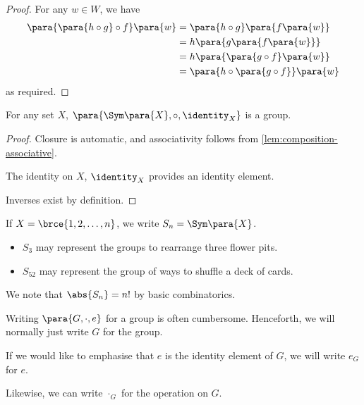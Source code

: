 \begin{proof}
    For any \(w \in W\), we have
    \begin{align*}
        \para{\para{h \circ g} \circ f} \para{w} &= \para{h \circ g} \para{f\para{w}} \\
        &= h \para{g \para{f \para{w}}} \\
        &= h \para{\para{g \circ f} \para{w}} \\
        &= \para{h \circ \para{g \circ f}} \para{w}
    \end{align*}
    as required.
\end{proof}

\begin{proposition}
    \label{prop:symmetry-group}%
    For any set \(X\), \(\para{\Sym\para{X}, \circ, \identity_X}\) is a group.
\end{proposition}

\begin{proof}
    Closure is automatic, and associativity follows from \autoref{lem:composition-associative}.

    The identity on \(X\), \(\identity_X\) provides an identity element.

    Inverses exist by definition.
\end{proof}

\begin{definition}[\(S_n\)]
    \label{def:s-n}%
    If \(X = \brce{1, 2, \ldots, n}\), we write \(S_n = \Sym\para{X}\).
\end{definition}

\begin{examples}
    \begin{itemize}
        \item \(S_3\) may represent the groups to rearrange three flower pits.
        \item \(S_{52}\) may represent the group of ways to shuffle a deck of cards.
    \end{itemize}
\end{examples}

\begin{remark}
    We note that \(\abs{S_n} = n!\) by basic combinatorics.
\end{remark}

\begin{notation}
    Writing \(\para{G, \cdot, e}\) for a group is often cumbersome. Henceforth, we will normally just write \(G\) for the group.
    
    If we would like to emphasise that \(e\) is the identity element of \(G\), we will write \(e_G\) for \(e\).

    Likewise, we can write \(\cdot_G\) for the operation on \(G\).
\end{notation}

